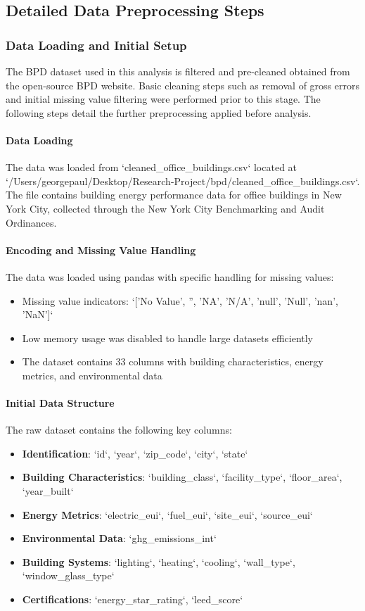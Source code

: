 \subsection{Detailed Data Preprocessing Steps}

\subsubsection{Data Loading and Initial Setup}

The BPD dataset used in this analysis is filtered and pre-cleaned obtained from the open-source BPD website. Basic cleaning steps such as removal of gross errors and initial missing value filtering were performed prior to this stage. The following steps detail the further preprocessing applied before analysis.

\paragraph{Data Loading}
The data was loaded from `cleaned\_office\_buildings.csv` located at `/Users/georgepaul/Desktop/Research-Project/bpd/cleaned\_office\_buildings.csv`. The file contains building energy performance data for office buildings in New York City, collected through the New York City Benchmarking and Audit Ordinances.

\paragraph{Encoding and Missing Value Handling}
The data was loaded using pandas with specific handling for missing values:
\begin{itemize}
    \item Missing value indicators: `['No Value', '', 'NA', 'N/A', 'null', 'Null', 'nan', 'NaN']`
    \item Low memory usage was disabled to handle large datasets efficiently
    \item The dataset contains 33 columns with building characteristics, energy metrics, and environmental data
\end{itemize}

\paragraph{Initial Data Structure}
The raw dataset contains the following key columns:
\begin{itemize}
    \item \textbf{Identification}: `id`, `year`, `zip\_code`, `city`, `state`
    \item \textbf{Building Characteristics}: `building\_class`, `facility\_type`, `floor\_area`, `year\_built`
    \item \textbf{Energy Metrics}: `electric\_eui`, `fuel\_eui`, `site\_eui`, `source\_eui`
    \item \textbf{Environmental Data}: `ghg\_emissions\_int`
    \item \textbf{Building Systems}: `lighting`, `heating`, `cooling`, `wall\_type`, `window\_glass\_type`
    \item \textbf{Certifications}: `energy\_star\_rating`, `leed\_score`
\end{itemize}

